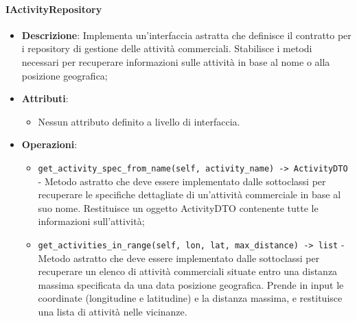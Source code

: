 \documentclass[10pt]{article}
\begin{document}
    \paragraph{IActivityRepository}
    \begin{itemize} 
    \item \textbf{Descrizione}: Implementa un'interfaccia astratta che definisce il contratto per i repository di gestione delle attività commerciali. Stabilisce i metodi necessari per recuperare informazioni sulle attività in base al nome o alla posizione geografica;
    \item \textbf{Attributi}:
    \begin{itemize}
        \item Nessun attributo definito a livello di interfaccia.
    \end{itemize}
    
    \item \textbf{Operazioni}:
    \begin{itemize}
        \item \texttt{get\_activity\_spec\_from\_name(self, activity\_name) -> ActivityDTO} - Metodo astratto che deve essere implementato dalle sottoclassi per recuperare le specifiche dettagliate di un'attività commerciale in base al suo nome. Restituisce un oggetto ActivityDTO contenente tutte le informazioni sull'attività;
        
        \item \texttt{get\_activities\_in\_range(self, lon, lat, max\_distance) -> list} - Metodo astratto che deve essere implementato dalle sottoclassi per recuperare un elenco di attività commerciali situate entro una distanza massima specificata da una data posizione geografica. Prende in input le coordinate (longitudine e latitudine) e la distanza massima, e restituisce una lista di attività nelle vicinanze.
    \end{itemize}
    \end{itemize}
\end{document}

